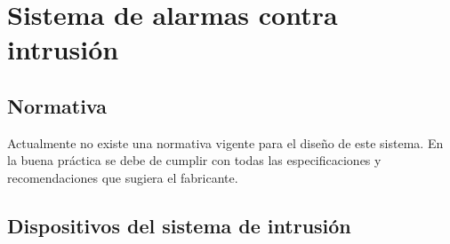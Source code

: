 %
%
%
%
%	
%	
%	
%	
%	























\newpage

\section{Sistema de alarmas contra intrusión}

\subsection{Normativa}

Actualmente no existe una normativa vigente para el diseño de este sistema. En la buena práctica se debe de cumplir con todas las especificaciones y recomendaciones que sugiera el fabricante.

\subsection{Dispositivos del sistema de intrusión}

